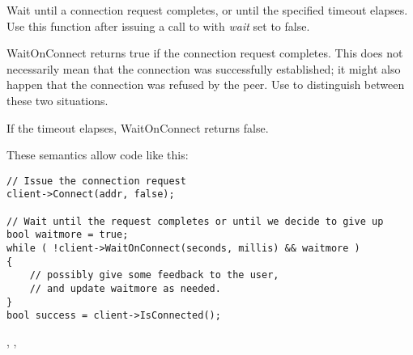 %
%
\label{wxsocketclientwaitonconnect}


Wait until a connection request completes, or until the specified timeout
elapses. Use this function after issuing a call
to  with {\it wait} set to false.





WaitOnConnect returns true if the connection request completes. This
does not necessarily mean that the connection was successfully established;
it might also happen that the connection was refused by the peer. Use 
 to distinguish between
these two situations.

If the timeout elapses, WaitOnConnect returns false.

These semantics allow code like this:

\begin{verbatim}
// Issue the connection request
client->Connect(addr, false);

// Wait until the request completes or until we decide to give up
bool waitmore = true; 
while ( !client->WaitOnConnect(seconds, millis) && waitmore )
{
    // possibly give some feedback to the user,
    // and update waitmore as needed.
}
bool success = client->IsConnected();
\end{verbatim}


, 
, 

\section{}\label{wxsocketevent}

